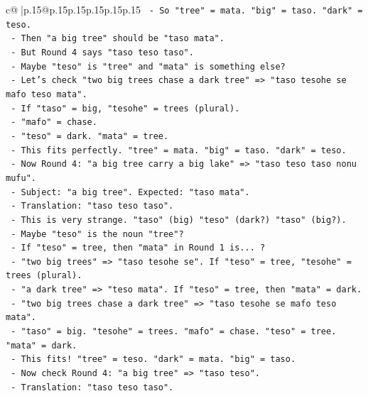 \documentclass{article}
\begin{document}
{\begin{supertabular}{c@{$\;$}|p{.15\linewidth}@{}p{.15\linewidth}p{.15\linewidth}p{.15\linewidth}p{.15\linewidth}p{.15\linewidth}}
{{{\texttt{          {-} So "tree" = mata. "big" = taso. "dark" = teso.} \\
\texttt{          {-} Then "a big tree" should be "taso mata".} \\
\texttt{          {-} But Round 4 says "taso teso taso".} \\
\texttt{          {-} Maybe "teso" is "tree" and "mata" is something else?} \\
\texttt{          {-} Let's check "two big trees chase a dark tree" => "taso tesohe se mafo teso mata".} \\
\texttt{            {-} If "taso" = big, "tesohe" = trees (plural).} \\
\texttt{            {-} "mafo" = chase.} \\
\texttt{            {-} "teso" = dark. "mata" = tree.} \\
\texttt{            {-} This fits perfectly. "tree" = mata. "big" = taso. "dark" = teso.} \\
\texttt{          {-} Now Round 4: "a big tree carry a big lake" => "taso teso taso nonu mufu".} \\
\texttt{            {-} Subject: "a big tree". Expected: "taso mata".} \\
\texttt{            {-} Translation: "taso teso taso".} \\
\texttt{            {-} This is very strange. "taso" (big) "teso" (dark?) "taso" (big?).} \\
\texttt{            {-} Maybe "teso" is the noun "tree"?} \\
\texttt{            {-} If "teso" = tree, then "mata" in Round 1 is... ?} \\
\texttt{            {-} "two big trees" => "taso tesohe se". If "teso" = tree, "tesohe" = trees (plural).} \\
\texttt{            {-} "a dark tree" => "teso mata". If "teso" = tree, then "mata" = dark.} \\
\texttt{            {-} "two big trees chase a dark tree" => "taso tesohe se mafo teso mata".} \\
\texttt{              {-} "taso" = big. "tesohe" = trees. "mafo" = chase. "teso" = tree. "mata" = dark.} \\
\texttt{              {-} This fits! "tree" = teso. "dark" = mata. "big" = taso.} \\
\texttt{            {-} Now check Round 4: "a big tree" => "taso teso".} \\
\texttt{              {-} Translation: "taso teso taso".} \\
}}}
\end{supertabular}}
\end{document}
